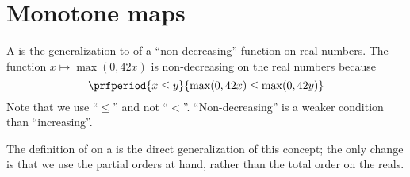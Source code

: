 
\section{Monotone maps}
\label{sec:monotonicity-monotone-maps}


A  is the generalization to  of a ``non-decreasing'' function on real numbers.
The function $x \mapsto \max(0, 42 x)$ is non-decreasing on the real numbers because
\begin{equation}\label{eq:monotone-eq-1}
    \prfperiod{
        x \leq y
    }{
        \max(0, 42 x) \leq \max(0, 42 y)
    }
\end{equation}
Note that we use ``$\leq$'' and not ``$<$''.
``Non-decreasing'' is a weaker condition than ``increasing''.

The definition of  on a  is the direct generalization of this concept; the only change is that we use the partial orders at hand, rather than the total order on the reals.

